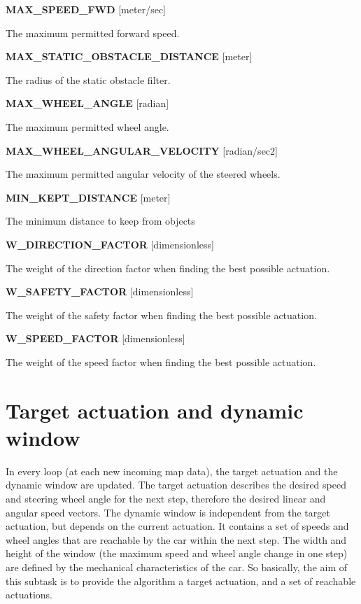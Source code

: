 \textbf{MAX\_SPEED\_FWD} [meter/sec]

The maximum permitted forward speed.

\textbf{MAX\_STATIC\_OBSTACLE\_DISTANCE} [meter]

The radius of the static obstacle filter.

\textbf{MAX\_WHEEL\_ANGLE} [radian]

The maximum permitted wheel angle. 

\textbf{MAX\_WHEEL\_ANGULAR\_VELOCITY} [radian/sec2]

The maximum permitted angular velocity of the steered wheels.

\textbf{MIN\_KEPT\_DISTANCE} [meter]

The minimum distance to keep from objects

\textbf{W\_DIRECTION\_FACTOR} [dimensionless]

The weight of the direction factor when finding the best possible actuation.

\textbf{W\_SAFETY\_FACTOR} [dimensionless]

The weight of the safety factor when finding the best possible actuation.

\textbf{W\_SPEED\_FACTOR} [dimensionless]

The weight of the speed factor when finding the best possible actuation.

\section{Target actuation and dynamic window}
\label{chap:target_actuation_and_dynamic_window}
In every loop (at each new incoming map data), the target actuation and the dynamic window are updated. The target actuation describes the desired speed and steering wheel angle for the next step, therefore the desired linear and angular speed vectors. The dynamic window is independent from the target actuation, but depends on the current actuation. It contains a set of speeds and wheel angles that are reachable by the car within the next step. The width and height of the window (the maximum speed and wheel angle change in one step) are defined by the mechanical characteristics of the car. So basically, the aim of this subtask is to provide the algorithm a target actuation, and a set of reachable actuations.

